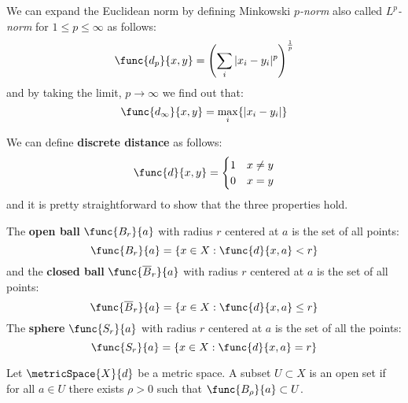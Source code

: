 We can expand the Euclidean norm by defining Minkowski \textit{\(p\)-norm} also called \textit{\(L^p\)-norm} for \(1 \leq p \leq \infty\) as follows:
\[\func{d_p}{x,y} = \left(\sum_{i}{|x_i - y_i|^p}\right)^{\frac{1}{p}}\]
and by taking the limit, \(p \to \infty\) we find out that:
\[\func{d_\infty}{x,y} = \max_{i} \{|x_i - y_i|\}\]

\begin{example}
    We can define \textbf{discrete distance} as follows:
    \[\func{d}{x,y} =
        \begin{cases}
            1 & x\neq y \\
            0 & x=y
        \end{cases}
    \]
    and it is pretty straightforward to show that the three properties hold.
\end{example}

\begin{definition}
    The \textbf{open ball} \(\func{B_r}{a}\) with radius \(r\) centered at \(a\) is the set of all points:
    \[ \func{B_r}{a} = \{ x \in X : \func{d}{x,a} < r\}\]
    and the \textbf{closed ball} \(\func{\overline{B}_r}{a}\) with radius \(r\) centered at \(a\) is the set of all points:
    \[\func{\overline{B}_r}{a} = \{ x \in X: \func{d}{x,a} \leq r\} \]
    The \textbf{sphere} \(\func{S_r}{a}\) with radius \(r\) centered at \(a\) is the set of all the points:
    \[ \func{S_r}{a} = \{ x \in X: \func{d}{x,a}  = r\} \]
\end{definition}

\begin{definition}
    Let \(\metricSpace{X}{d}\) be a metric space. A subset \(U \subset X\) is an open set if for all \(a \in U\) there exists \(\rho > 0\) such that \( \func{B_\rho}{a} \subset U\).
\end{definition}

